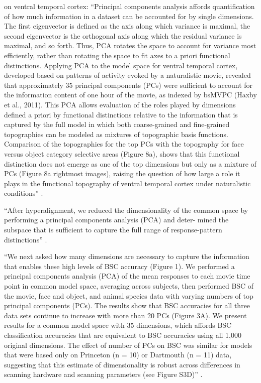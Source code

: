 \citep{haxby2020hyperalignment} on ventral temporal cortex: ``Principal
components analysis affords quantification of how much information in a dataset
can be accounted for by single dimensions. The first eigenvector is defined as
the axis along which variance is maximal, the second eigenvector is the
orthogonal axis along which the residual variance is maximal, and so forth.
Thus, PCA rotates the space to account for variance most efficiently, rather
than rotating the space to fit axes to a priori functional distinctions.
Applying PCA to the model space for ventral temporal cortex, developed based on
patterns of activity evoked by a naturalistic movie, revealed that approximately
35 principal components (PCs) were sufficient to account for the information
content of one hour of the movie, as indexed by bsMVPC (Haxby et al., 2011).
This PCA allows evaluation of the roles played by dimensions defined a priori by
functional distinctions relative to the information that is captured by the full
model in which both coarse-grained and fine-grained topographies can be modeled
as mixtures of topographic basis functions. Comparison of the topographies for
the top PCs with the topography for face versus object category selective areas
(Figure 8a), shows that this functional distinction does not emerge as one of
the top dimensions but only as a mixture of PCs (Figure 8a rightmost images),
raising the question of how large a role it plays in the functional topography
of ventral temporal cortex under naturalistic conditions''
\citep{haxby2020hyperalignment}.

``After hyperalignment, we reduced the dimensionality of the common space by
performing a principal components analysis (PCA) and deter- mined the subspace
that is sufficient to capture the full range of response-pattern distinctions''
\citep{haxby2011common}.

``We next asked how many dimensions are necessary to capture the information
that enables these high levels of BSC accuracy (Figure 1). We performed a
principal components analysis (PCA) of the mean responses to each movie time
point in common model space, averaging across subjects, then performed BSC of
the movie, face and object, and animal species data with varying numbers of top
principal components (PCs). The results show that BSC accuracies for all three
data sets continue to increase with more than 20 PCs (Figure 3A). We present
results for a common model space with 35 dimensions, which affords BSC
classification accuracies that are equivalent to BSC accuracies using all 1,000
original dimensions. The effect of number of PCs on BSC was similar for models
that were based only on Princeton (n = 10) or Dartmouth (n = 11) data,
suggesting that this estimate of dimensionality is robust across differences in
scanning hardware and scanning parameters (see Figure S3D)''
\citep{haxby2011common}.

